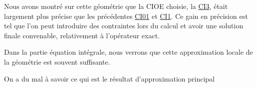 Nous avons montré sur cette géométrie que la CIOE choisie, la \hyperlink{ci3}{CI3}, était largement plus précise que les précédentes \hyperlink{ci01}{CI01} et \hyperlink{ci1}{CI1}. Ce gain en précision est tel que l'on peut introduire des contraintes lors du calcul et avoir une solution finale convenable, relativement à l'opérateur exact.

Dans la partie équation intégrale, nous verrons que cette approximation locale de la géométrie est souvent suffisante.

\begin{REM}
    On a du mal à savoir ce qui est le résultat d'approximation principal
\end{REM}